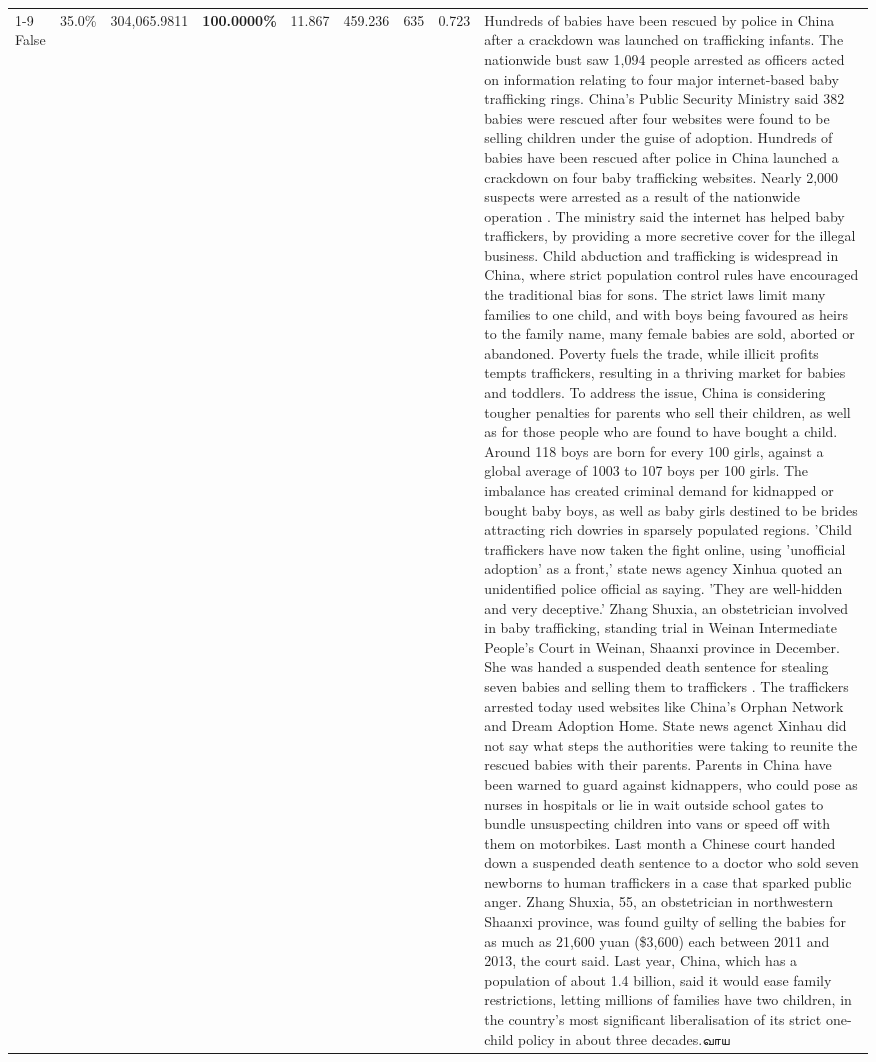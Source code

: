 \begin{table}[H]
\begin{tabular}{lllrlllll}
\cline{1-9}
False & 35.0\% & 304,065.9811 & \bfseries \color{red} 100.0000\% & 11.867 & 459.236 & 635 & 0.723 & Hundreds of babies have been rescued by police in China after a crackdown was launched on trafficking infants. The nationwide bust saw 1,094 people arrested as officers acted on information relating to four major internet-based baby trafficking rings. China's Public Security Ministry said 382 babies were rescued after four websites were found to be selling children under the guise of adoption. Hundreds of babies have been rescued after police in China launched a crackdown on four baby trafficking websites. Nearly 2,000 suspects were arrested as a result of the nationwide operation . The ministry said the internet has helped baby traffickers, by providing a more secretive cover for the illegal business. Child abduction and trafficking is widespread in China, where strict population control rules have encouraged the traditional bias for sons. The strict laws limit many families to one child, and with boys being favoured as heirs to the family name, many female babies are sold, aborted or abandoned. Poverty fuels the trade, while illicit profits tempts traffickers, resulting in a thriving market for babies and toddlers. To address the issue, China is considering tougher penalties for parents who sell their children, as well as for those people who are found to have bought a child. Around 118 boys are born for every 100 girls, against a global average of 1003 to 107 boys per 100 girls. The imbalance has created criminal demand for kidnapped or bought baby boys, as well as baby girls destined to be brides attracting rich dowries in sparsely populated regions. 'Child traffickers have now taken the fight online, using 'unofficial adoption' as a front,' state news agency Xinhua quoted an unidentified police official as saying. 'They are well-hidden and very deceptive.' Zhang Shuxia, an obstetrician involved in baby trafficking, standing trial in Weinan Intermediate People's Court in Weinan, Shaanxi province in December. She was handed a suspended death sentence for stealing seven babies and selling them to traffickers . The traffickers arrested today used websites like China's Orphan Network and Dream Adoption Home. State news agenct Xinhau did not say what steps the authorities were taking to reunite the rescued babies with their parents. Parents in China have been warned to guard against kidnappers, who could pose as nurses in hospitals or lie in wait outside school gates to bundle unsuspecting children into vans or speed off with them on motorbikes. Last month a Chinese court handed down a suspended death sentence to a doctor who sold seven newborns to human traffickers in a case that sparked public anger. Zhang Shuxia, 55, an obstetrician in northwestern Shaanxi province, was found guilty of selling the babies for as much as 21,600 yuan (\$3,600) each between 2011 and 2013, the court said. Last year, China, which has a population of about 1.4 billion, said it would ease family restrictions, letting millions of families have two children, in the country's most significant liberalisation of its strict one-child policy in about three decades.வாய \\

\end{tabular}
\end{table}

